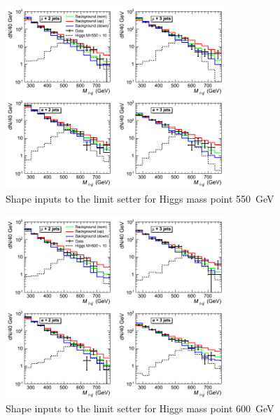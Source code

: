 \begin{figure}[h!]
\begin{center}
\includegraphics[width=0.75\textwidth]{plots/2012_SHAPES/hww-histo-shapes-M=550}
\caption{Shape inputs to the limit setter for Higgs mass point 550~GeV}
\end{center}
\end{figure}
\begin{figure}[h!]
\begin{center}
\includegraphics[width=0.75\textwidth]{plots/2012_SHAPES/hww-histo-shapes-M=600}
\caption{Shape inputs to the limit setter for Higgs mass point 600~GeV}
\end{center}
\end{figure}

